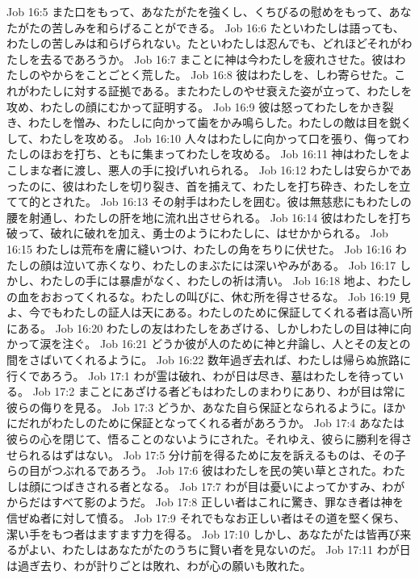 Job 16:5  また口をもって、あなたがたを強くし、くちびるの慰めをもって、あなたがたの苦しみを和らげることができる。
Job 16:6  たといわたしは語っても、わたしの苦しみは和らげられない。たといわたしは忍んでも、どれほどそれがわたしを去るであろうか。
Job 16:7  まことに神は今わたしを疲れさせた。彼はわたしのやからをことごとく荒した。
Job 16:8  彼はわたしを、しわ寄らせた。これがわたしに対する証拠である。またわたしのやせ衰えた姿が立って、わたしを攻め、わたしの顔にむかって証明する。
Job 16:9  彼は怒ってわたしをかき裂き、わたしを憎み、わたしに向かって歯をかみ鳴らした。わたしの敵は目を鋭くして、わたしを攻める。
Job 16:10  人々はわたしに向かって口を張り、侮ってわたしのほおを打ち、ともに集まってわたしを攻める。
Job 16:11  神はわたしをよこしまな者に渡し、悪人の手に投げいれられる。
Job 16:12  わたしは安らかであったのに、彼はわたしを切り裂き、首を捕えて、わたしを打ち砕き、わたしを立てて的とされた。
Job 16:13  その射手はわたしを囲む。彼は無慈悲にもわたしの腰を射通し、わたしの肝を地に流れ出させられる。
Job 16:14  彼はわたしを打ち破って、破れに破れを加え、勇士のようにわたしに、はせかかられる。
Job 16:15  わたしは荒布を膚に縫いつけ、わたしの角をちりに伏せた。
Job 16:16  わたしの顔は泣いて赤くなり、わたしのまぶたには深いやみがある。
Job 16:17  しかし、わたしの手には暴虐がなく、わたしの祈は清い。
Job 16:18  地よ、わたしの血をおおってくれるな。わたしの叫びに、休む所を得させるな。
Job 16:19  見よ、今でもわたしの証人は天にある。わたしのために保証してくれる者は高い所にある。
Job 16:20  わたしの友はわたしをあざける、しかしわたしの目は神に向かって涙を注ぐ。
Job 16:21  どうか彼が人のために神と弁論し、人とその友との間をさばいてくれるように。
Job 16:22  数年過ぎ去れば、わたしは帰らぬ旅路に行くであろう。
Job 17:1  わが霊は破れ、わが日は尽き、墓はわたしを待っている。
Job 17:2  まことにあざける者どもはわたしのまわりにあり、わが目は常に彼らの侮りを見る。
Job 17:3  どうか、あなた自ら保証となられるように。ほかにだれがわたしのために保証となってくれる者があろうか。
Job 17:4  あなたは彼らの心を閉じて、悟ることのないようにされた。それゆえ、彼らに勝利を得させられるはずはない。
Job 17:5  分け前を得るために友を訴えるものは、その子らの目がつぶれるであろう。
Job 17:6  彼はわたしを民の笑い草とされた。わたしは顔につばきされる者となる。
Job 17:7  わが目は憂いによってかすみ、わがからだはすべて影のようだ。
Job 17:8  正しい者はこれに驚き、罪なき者は神を信ぜぬ者に対して憤る。
Job 17:9  それでもなお正しい者はその道を堅く保ち、潔い手をもつ者はますます力を得る。
Job 17:10  しかし、あなたがたは皆再び来るがよい、わたしはあなたがたのうちに賢い者を見ないのだ。
Job 17:11  わが日は過ぎ去り、わが計りごとは敗れ、わが心の願いも敗れた。
